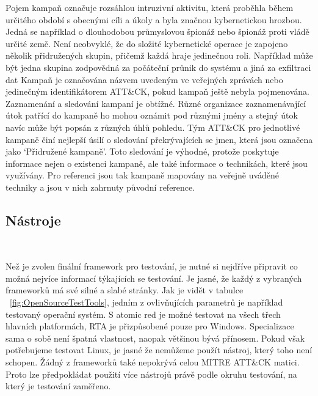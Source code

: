 Pojem kampaň označuje rozsáhlou intruzivní aktivitu, která proběhla během určitého období s obecnými cíli a úkoly a byla značnou kybernetickou hrozbou.
Jedná se například o dlouhodobou průmyslovou špionáž nebo špionáž proti vládě určité země.
Není neobvyklé, že do složité kybernetické operace je zapojeno několik přidružených skupin, přičemž každá hraje jedinečnou roli.
Například může být jedna skupina zodpovědná za počáteční průnik do systému a jiná za exfiltraci dat
Kampaň je označována názvem uvedeným ve veřejných zprávách nebo jedinečným identifikátorem ATT\&CK, pokud kampaň ještě nebyla pojmenována.
Zaznamenání a sledování kampaní je obtížné.
Různé organizace zaznamenávající útok patřící do kampaně ho mohou oznámit pod různými jmény a stejný útok navíc může být popsán z různých úhlů pohledu.
Tým ATT\&CK pro jednotlivé kampaně činí nejlepší úsilí o sledování překrývajících se jmen, která jsou označena jako `Přidružené kampaně'.
Toto sledování je výhodné, protože poskytuje informace nejen o existenci kampaně, ale také informace o technikách, které jsou využívány.
Pro referenci jsou tak kampaně mapovány na veřejně uváděné techniky a jsou v nich zahrnuty původní reference.\cite{Mitre_campaigns}

\subsection{Nástroje}\label{subsec:nastroje}
~

Než je zvolen finální framework pro testování, je nutné si nejdříve připravit co možná nejvíce informací týkajících se testování.
Je jasné, že každý z vybraných frameworků má své silné a slabé stránky.
Jak je vidět v tabulce ~\ref{fig:OpenSourceTestTools}, jedním z ovlivňujících parametrů je například testovaný operační systém.
S atomic red je možné testovat na všech třech hlavních platformách, \ac{RTA} je přizpůsobené pouze pro Windows.
Specializace sama o sobě není špatná vlastnost, naopak většinou bývá přínosem.
Pokud však potřebujeme testovat Linux, je jasné že nemůžeme použít nástroj, který toho není schopen.
Žádný z frameworků také nepokrývá celou MITRE ATT\&CK matici.
Proto lze předpokládat použití více nástrojů právě podle okruhu testování, na který je testování zaměřeno.

